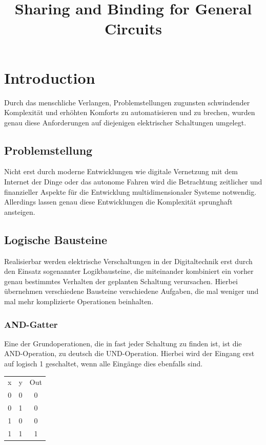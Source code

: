 \documentclass[conference]{IEEEtran}
\begin{document}
\begin{titlepage}

\title{Sharing and Binding for General Circuits\\}

\author{
}
\maketitle
\begin{abstract}

\end{abstract}
\end{titlepage}


\newpage
\section{Introduction}
Durch das menschliche Verlangen, Problemstellungen zugunsten schwindender Komplexität und erhöhten Komforts zu automatisieren und zu brechen, wurden genau diese Anforderungen auf diejenigen elektrischer Schaltungen umgelegt. 
\subsection{Problemstellung}
Nicht erst durch moderne Entwicklungen wie digitale Vernetzung mit dem Internet der Dinge  oder das autonome Fahren wird die Betrachtung zeitlicher und finanzieller Aspekte für die Entwicklung multidimensionaler Systeme notwendig. Allerdings lassen genau diese Entwicklungen die Komplexität sprunghaft ansteigen.

\subsection{Logische Bausteine}
Realisierbar werden elektrische Verschaltungen in der Digitaltechnik erst durch den Einsatz sogenannter Logikbausteine, die miteinander kombiniert ein vorher genau bestimmtes Verhalten der geplanten Schaltung verursachen.
Hierbei übernehmen verschiedene Bausteine verschiedene Aufgaben, die mal weniger und mal mehr komplizierte Operationen beinhalten. 
\subsubsection{AND-Gatter}
Eine der Grundoperationen, die in fast jeder Schaltung zu finden ist, ist die AND-Operation, zu deutsch die UND-Operation. Hierbei wird der Eingang erst auf logisch 1 geschaltet, wenn alle Eingänge dies ebenfalls sind.\\
\begin{center}
\begin{tabular}[h]{ccc}
x&y&Out\\
0&0&0\\
0&1&0\\
1&0&0\\
1&1&1\\
\end{tabular}
\end{center}
\end{document}
